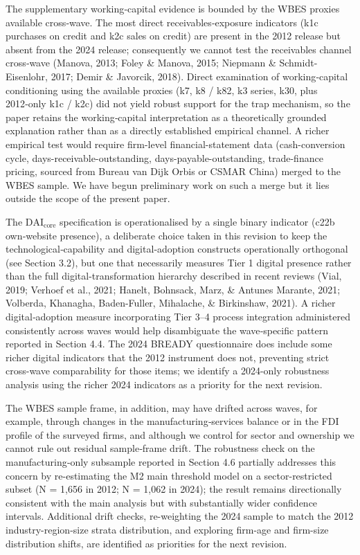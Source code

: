 \documentclass[12pt,a4paper]{article}
\begin{document}
The supplementary working‑capital evidence is bounded by the WBES
proxies available cross‑wave. The most direct receivables‑exposure
indicators (k1c purchases on credit and k2c sales on credit) are present
in the 2012 release but absent from the 2024 release; consequently we
cannot test the receivables channel cross‑wave (Manova, 2013; Foley \&
Manova, 2015; Niepmann \& Schmidt-Eisenlohr, 2017; Demir \& Javorcik,
2018). Direct examination of working‑capital conditioning using the
available proxies (k7, k8 / k82, k3 series, k30, plus 2012‑only k1c /
k2c) did not yield robust support for the trap mechanism, so the paper
retains the working‑capital interpretation as a theoretically grounded
explanation rather than as a directly established empirical channel. A
richer empirical test would require firm-level financial-statement data
(cash-conversion cycle, days-receivable-outstanding,
days-payable-outstanding, trade-finance pricing, sourced from Bureau van
Dijk Orbis or CSMAR China) merged to the WBES sample. We have begun
preliminary work on such a merge but it lies outside the scope of the
present paper.

The \(\mathrm{DAI}_{\text{core}}\) specification is operationalised by a
single binary indicator (c22b own‑website presence), a deliberate choice
taken in this revision to keep the technological‑capability and
digital‑adoption constructs operationally orthogonal (see Section 3.2),
but one that necessarily measures Tier 1 digital presence rather than
the full digital-transformation hierarchy described in recent reviews
(Vial, 2019; Verhoef et al., 2021; Hanelt, Bohnsack, Marz, \& Antunes
Marante, 2021; Volberda, Khanagha, Baden-Fuller, Mihalache, \&
Birkinshaw, 2021). A richer digital‑adoption measure incorporating Tier
3--4 process integration administered consistently across waves would
help disambiguate the wave‑specific pattern reported in Section 4.4. The
2024 BREADY questionnaire does include some richer digital indicators
that the 2012 instrument does not, preventing strict cross-wave
comparability for those items; we identify a 2024-only robustness
analysis using the richer 2024 indicators as a priority for the next
revision.

The WBES sample frame, in addition, may have drifted across waves, for
example, through changes in the manufacturing‑services balance or in the
FDI profile of the surveyed firms, and although we control for sector
and ownership we cannot rule out residual sample‑frame drift. The
robustness check on the manufacturing‑only subsample reported in Section
4.6 partially addresses this concern by re-estimating the M2 main
threshold model on a sector-restricted subset (N = 1,656 in 2012; N =
1,062 in 2024); the result remains directionally consistent with the
main analysis but with substantially wider confidence intervals.
Additional drift checks, re-weighting the 2024 sample to match the 2012
industry-region-size strata distribution, and exploring firm-age and
firm-size distribution shifts, are identified as priorities for the next
revision.
\end{document}
